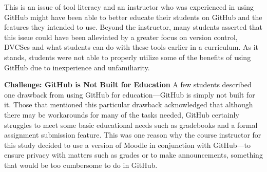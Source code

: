 


This is an issue of tool literacy and an instructor who was experienced in using GitHub might have been able to better educate their students on GitHub and the features they intended to use. Beyond the instructor, many students asserted that this issue could have been alleviated by a greater focus on version control, DVCSes and what students can do with these tools earlier in a curriculum. As it stands, students were not able to properly utilize some of the benefits of using GitHub due to inexperience and unfamiliarity. %

\textbf{Challenge: GitHub is Not Built for Education}
A few students described one drawback from using GitHub for education---GitHub is simply not built for it. Those that mentioned this particular drawback acknowledged that although there may be workarounds for many of the tasks needed, GitHub certainly struggles to meet some basic educational needs such as gradebooks and a formal assignment submission feature. This was one reason why the course instructor for this study decided to use a version of Moodle in conjunction with GitHub---to ensure privacy with matters such as grades or to make announcements, something that would be too cumbersome to do in GitHub.

